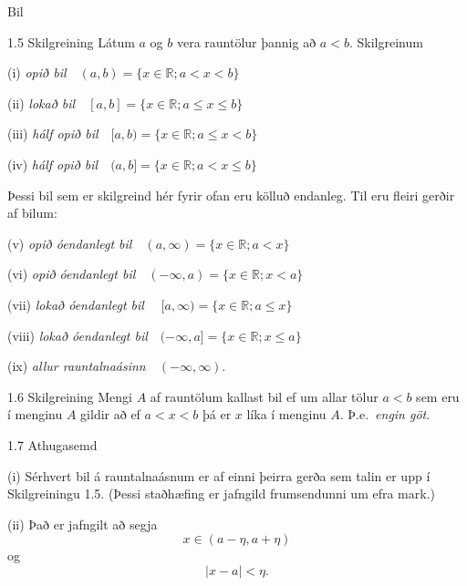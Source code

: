 \documentclass[icelandic,a4paper,12pt]{article}
\newcommand{\R}{{\mathbb  R}}
\begin{document}
\begin{frame}{Bil}
\begin{block}{1.5 Skilgreining}  
Látum $a$ og $b$ vera rauntölur þannig að $a<b$.  
Skilgreinum 

(i) {\em opið bil}\ \ $(a,b)=\{x\in \R ; a<x<b\}$

(ii) {\em lokað bil}\ \ $[a,b]=\{x\in \R ; a\leq x\leq b\}$

(iii) {\em hálf opið bil}\ \ $[a,b)=\{x\in \R ; a\leq x<b\}$

(iv) {\em hálf opið bil}\ \ $(a,b]=\{x\in \R ; a< x\leq b\}$

\medskip

Þessi bil sem er skilgreind hér fyrir ofan eru kölluð endanleg.  Til
eru fleiri gerðir af bilum:


(v)  {\em opið óendanlegt bil}\ \    $(a,\infty)=\{x\in \R ; a<x\}$

(vi)  {\em opið óendanlegt bil}\ \    $(-\infty, a)=\{x\in \R ; x<a\}$

(vii)  {\em lokað óendanlegt bil} \ \ $[a,\infty)=\{x\in \R ; a\leq x\}$

(viii)  {\em lokað óendanlegt bil}\ \  $(-\infty, a]=\{x\in \R ; x\leq a\}$

(ix)  {\em allur rauntalnaásinn}\ \  $(-\infty, \infty)$.

\end{block}
\end{frame}

\begin{frame}
\begin{block}{1.6 Skilgreining} Mengi $A$ af rauntölum kallast bil ef um
allar tölur $a<b$ sem eru í menginu $A$ gildir að ef $a<x<b$ þá er $x$
líka í menginu $A$. \pause Þ.e.~\emph{engin göt}.
\end{block}

\pause

\begin{block}{1.7 Athugasemd}  

(i) Sérhvert bil á rauntalnaásnum er af
einni þeirra gerða sem talin er upp í Skilgreiningu 1.5.   (Þessi
staðhæfing er jafngild frumsendunni um efra mark.)

\pause

(ii) Það er jafngilt að segja 
$$x \in (a-\eta,a+\eta)$$ 
og 
$$|x-a| < \eta.$$
\end{block}
\end{frame}
\end{document}
